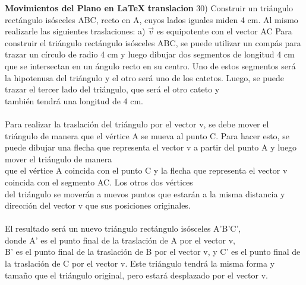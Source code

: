 \documentclass{article}
\begin{document}
{\LARGE \textbf{Movimientos del Plano en \LaTeX}}
{\large \textbf{translacion}}
30) Construir un triángulo rectángulo isósceles ABC, recto en A, cuyos lados iguales miden 4 cm. Al mismo realizarle las siguientes traslaciones:
a) $\vec{v}$ es equipotente con el vector AC
Para construir el triángulo rectángulo isósceles ABC, se puede utilizar un compás para trazar un círculo de radio 4 cm y luego dibujar dos segmentos de longitud 4 cm que se intersectan en un ángulo recto en su centro. Uno de estos segmentos será la hipotenusa del triángulo y el otro será uno de los catetos. Luego, se puede trazar el tercer lado del triángulo, que será el otro cateto y\\
también tendrá una longitud de 4 cm.\\
\\
Para realizar la traslación del triángulo por el vector v, se debe mover el triángulo de manera que el vértice A se mueva al punto C. Para hacer esto, se puede dibujar una flecha que representa el vector v a partir del punto A y luego mover el triángulo de manera\\
que el vértice A coincida con el punto C y la flecha que representa el vector v coincida con el segmento AC. Los otros dos vértices\\
del triángulo se moverán a nuevos puntos que estarán a la misma distancia y dirección del vector v que sus posiciones originales.\\
\\
El resultado será un nuevo triángulo rectángulo isósceles A'B'C',\\
donde A' es el punto final de la traslación de A por el vector v,\\
B' es el punto final de la traslación de B por el vector v, y C' es el punto final de la traslación de C por el vector v. Este triángulo tendrá la misma forma y tamaño que el triángulo original, pero estará desplazado por el vector v.\\
\\
\end{document}
